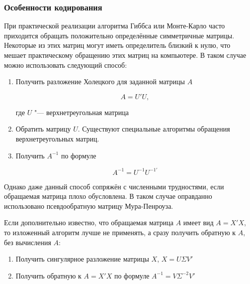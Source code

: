 \documentclass[11pt]{article} %
\begin{document}
\subsubsection{Особенности кодирования}

При практической реализации алгоритма Гиббса или Монте-Карло часто
приходится обращать положительно определённые симметричные матрицы. Некоторые из этих матриц могут иметь определитель близкий к нулю, что мешает практическому обращению этих матриц на компьютере.
В таком случае можно использовать следующий способ:


\begin{enumerate}

\item Получить разложение Холецкого для заданной матрицы $A$

\[
A=U'U,
\]

где $U$ "--- верхнетреугольная матрица

\item Обратить матрицу $U$. Существуют специальные алгоритмы обращения
верхнетреугольных матриц.

\item Получить $A^{-1}$ по формуле

\[
A^{-1}=U^{-1}U^{-1\prime}
\]

\end{enumerate}


Однако даже данный способ сопряжён с численными трудностями, если
обращаемая матрица плохо обусловлена. В таком случае оправданно использовано
псевдообратную матрицу Мура-Пенроуза.

Если дополнительно известно, что обращаемая матрица $A$ имеет вид $A=X'X$, то изложенный алгоритм лучше не применять, а сразу получить обратную к $A$, без вычисления $A$:

\begin{enumerate}
\item Получить сингулярное разложение матрицы $X$, $X=U\Sigma V'$
\item Получить обратную к $A=X'X$ по формуле $A^{-1}=V\Sigma^{-2} V'$
\end{enumerate}


%
%
\end{document}
